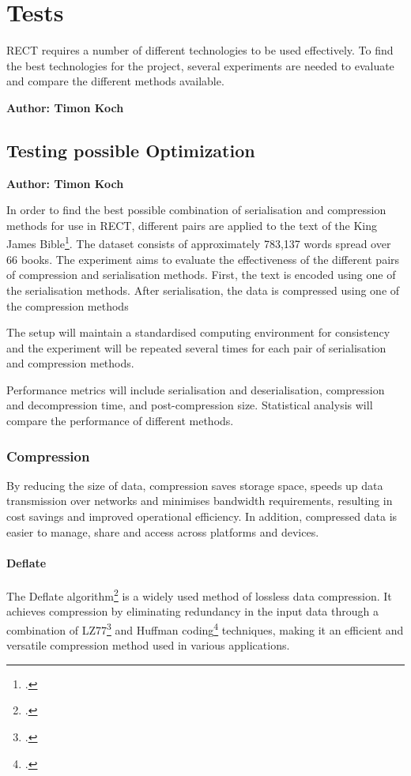 \chapter{Tests}

RECT requires a number of different technologies to be used effectively. To find the best technologies for the project, several experiments are needed to evaluate and compare the different methods available. 

\textbf{Author: Timon Koch}

\section{Testing possible Optimization}
\textbf{Author: Timon Koch}

In order to find the best possible combination of serialisation and compression methods for use in RECT, different pairs are applied to the text of the King James Bible\footcite{king_james_bible}. The dataset consists of approximately 783,137 words spread over 66 books. The experiment aims to evaluate the effectiveness of the different pairs of compression and serialisation methods. First, the text is encoded using one of the serialisation methods. After serialisation, the data is compressed using one of the compression methods

The setup will maintain a standardised computing environment for consistency and the experiment will be repeated several times for each pair of serialisation and compression methods.

Performance metrics will include serialisation and deserialisation, compression and decompression time, and post-compression size. Statistical analysis will compare the performance of different methods.

\subsection{Compression}
By reducing the size of data, compression saves storage space, speeds up data transmission over networks and minimises bandwidth requirements, resulting in cost savings and improved operational efficiency. In addition, compressed data is easier to manage, share and access across platforms and devices. 

\subsubsection{Deflate}
The Deflate algorithm\footcite{deflate} is a widely used method of lossless data compression. It achieves compression by eliminating redundancy in the input data through a combination of LZ77\footcite{lz77} and Huffman coding\footcite{huffman_coding} techniques, making it an efficient and versatile compression method used in various applications.

